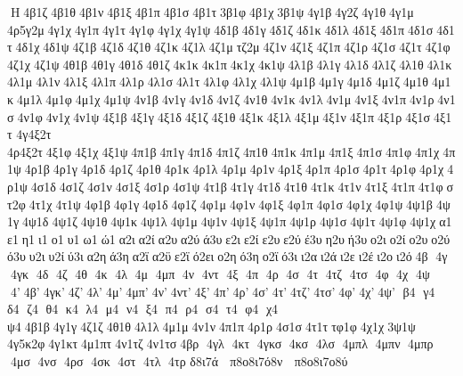 H 4β1ζ 4β1θ 4β1ν 4β1ξ 4β1π 4β1σ 4β1τ 3β1φ 4β1χ 3β1ψ 4γ1β 4γ2ζ 4γ1θ 4γ1μ 	4ρ5γ2μ 4γ1χ 4γ1π 4γ1τ 4γ1φ 4γ1χ 4γ1ψ 4δ1β 4δ1γ 4δ1ζ 4δ1κ 4δ1λ 4δ1ξ 4δ1π 4δ1σ 4δ1τ 4δ1χ 4δ1ψ 4ζ1β 4ζ1δ 4ζ1θ 4ζ1κ 4ζ1λ 4ζ1μ τζ2μ 4ζ1ν 4ζ1ξ 4ζ1π 4ζ1ρ 4ζ1σ 4ζ1τ 4ζ1φ 4ζ1χ 4ζ1ψ 4θ1β 4θ1γ 4θ1δ 4θ1ζ 4κ1κ 4κ1π 4κ1χ 4κ1ψ 4λ1β 4λ1γ 4λ1δ 4λ1ζ 4λ1θ 4λ1κ 4λ1μ 4λ1ν 4λ1ξ 4λ1π 4λ1ρ 4λ1σ 4λ1τ 4λ1φ 4λ1χ 4λ1ψ 4μ1β 4μ1γ 4μ1δ 4μ1ζ 4μ1θ 4μ1κ 4μ1λ 4μ1φ 4μ1χ 4μ1ψ 4ν1β 4ν1γ 4ν1δ 4ν1ζ 4ν1θ 4ν1κ 4ν1λ 4ν1μ 4ν1ξ 4ν1π 4ν1ρ 4ν1σ 4ν1φ 4ν1χ 4ν1ψ 4ξ1β 4ξ1γ 4ξ1δ 4ξ1ζ 4ξ1θ 4ξ1κ 4ξ1λ 4ξ1μ 4ξ1ν 4ξ1π 4ξ1ρ 4ξ1σ 4ξ1τ 	4γ4ξ2τ 	4ρ4ξ2τ 4ξ1φ 4ξ1χ 4ξ1ψ 4π1β 4π1γ 4π1δ 4π1ζ 4π1θ 4π1κ 4π1μ 4π1ξ 4π1σ 4π1φ 4π1χ 4π1ψ 4ρ1β 4ρ1γ 4ρ1δ 4ρ1ζ 4ρ1θ 4ρ1κ 4ρ1λ 4ρ1μ 4ρ1ν 4ρ1ξ 4ρ1π 4ρ1σ 4ρ1τ 4ρ1φ 4ρ1χ 4ρ1ψ 4σ1δ 4σ1ζ 4σ1ν 4σ1ξ 4σ1ρ 4σ1ψ 4τ1β 4τ1γ 4τ1δ 4τ1θ 4τ1κ 4τ1ν 4τ1ξ 4τ1π 4τ1φ στ2φ 4τ1χ 4τ1ψ 4φ1β 4φ1γ 4φ1δ 4φ1ζ 4φ1μ 4φ1ν 4φ1ξ 4φ1π 4φ1σ 4φ1χ 4φ1ψ 4ψ1β 4ψ1γ 4ψ1δ 4ψ1ζ 4ψ1θ 4ψ1κ 4ψ1λ 4ψ1μ 4ψ1ν 4ψ1ξ 4ψ1π 4ψ1ρ 4ψ1σ 4ψ1τ 4ψ1φ 4ψ1χ α1 ε1 η1 ι1 ο1 υ1 ω1 ώ1 α2ι α2ί α2υ α2ύ ά3υ ε2ι ε2ί ε2υ ε2ύ έ3υ η2υ ή3υ ο2ι ο2ί ο2υ ο2ύ ό3υ υ2ι υ2ί ύ3ι α2η ά3η α2ϊ α2ϋ ε2ϊ ό2ει ο2η ό3η ο2ϊ ό3ι ι2α ι2ά ι2ε ι2έ ι2ο ι2ό 4β  4γ  4γκ  4δ  4ζ  4θ  4κ  4λ  4μ  4μπ  4ν  4ντ  4ξ  4π  4ρ  4σ  4τ  4τζ  4τσ  4φ  4χ  4ψ  4' 4β' 4γκ' 4ζ' 4λ' 4μ' 4μπ' 4ν' 4ντ' 4ξ' 4π' 4ρ' 4σ' 4τ' 4τζ' 4τσ' 4φ' 4χ' 4ψ'  β4  γ4  δ4  ζ4  θ4  κ4  λ4  μ4  ν4  ξ4  π4  ρ4  σ4  τ4  φ4  χ4  ψ4 4β1β 4γ1γ 4ζ1ζ 4θ1θ 4λ1λ 4μ1μ 4ν1ν 4π1π 4ρ1ρ 4σ1σ 4τ1τ τφ1φ 4χ1χ 3ψ1ψ 	4γ5κ2φ 4γ1κτ 4μ1πτ 4ν1τζ 4ν1τσ 4βρ  4γλ  4κτ  4γκσ  4κσ  4λσ  4μπλ  4μπν  4μπρ  4μσ  4νσ  4ρσ  4σκ  4στ  4τλ  4τρ  
 δ8ι7ά   π8ο8ι7ό8ν   π8ο8ι7ο8ύ 